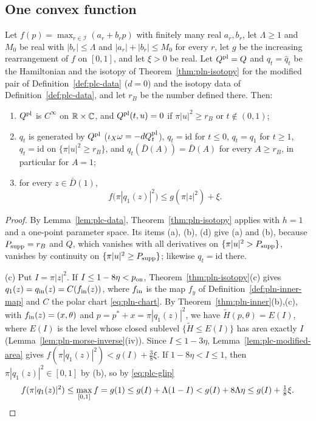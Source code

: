\subsection{One convex function}\label{sec:plc-planar}

\begin{theorem}\label{thm:plc-planar}
Let $f(p)=\max_{r\in\mathcal I}(a_r+b_rp)$ with finitely many real $a_r,b_r$, let $\Lambda\ge1$ and $M_0$ be real with $|b_r|\le\Lambda$
and $|a_r|+|b_r|\le M_0$ for every $r$, let $g$ be the increasing rearrangement of $f$ on $[0,1]$, and let $\xi>0$ be real. Let
$Q^{\rm pl}=Q$ and $q_t=\hat q_t$ be the Hamiltonian and the isotopy of Theorem~\ref{thm:pln-isotopy} for the
modified pair of Definition~\ref{def:plc-data} ($d=0$) and the isotopy data of Definition~\ref{def:plc-data}, and let $r_B$ be
the number defined there. Then:
\begin{enumerate}[label=(\alph*)]
\item $Q^{\rm pl}$ is $C^\infty$ on $\mathbb{R}\times\mathbb{C}$, and $Q^{\rm pl}(t,u)=0$ if $\pi|u|^2\ge r_B$ or $t\notin(0,1)$;
\item $q_t$ is generated by $Q^{\rm pl}$ ($\iota_X\omega=-dQ^{\rm pl}_t$), $q_t=\mathrm{id}$ for $t\le0$, $q_t=q_1$ for $t\ge1$,
 $q_t=\mathrm{id}$ on $\{\pi|u|^2\ge r_B\}$, and $q_t(\bar D(A))=\bar D(A)$ for every $A\ge r_B$, in particular for $A=1$;
\item for every $z\in\bar D(1)$,
 \[
  f\bigl(\pi|q_1(z)|^2\bigr)\le g(\pi|z|^2)+\xi .
 \]
\end{enumerate}
\end{theorem}

\begin{proof}
By Lemma~\ref{lem:plc-data}, Theorem~\ref{thm:pln-isotopy} applies with $h=1$ and a one-point parameter space. Its
items (a), (b), (d) give (a) and (b), because $P_{\rm supp}=r_B$ and $Q$, which vanishes with all derivatives on
$\{\pi|u|^2>P_{\rm supp}\}$, vanishes by continuity on $\{\pi|u|^2\ge P_{\rm supp}\}$; likewise $q_t=\mathrm{id}$ there.

(c) Put $I=\pi|z|^2$. If $I\le1-8\eta<p_{\rm on}$, Theorem~\ref{thm:pln-isotopy}(c) gives $q_1(z)=q_{\rm in}(z)=C(f_{\rm in}(z))$,
where $f_{\rm in}$ is the map $f_y$ of Definition~\ref{def:pln-inner-map} and $C$ the polar chart \eqref{eq:pln-chart}. By
Theorem~\ref{thm:pln-inner}(b),(c), with $f_{\rm in}(z)=(x,\theta)$ and $p=p^*+x=\pi|q_1(z)|^2$, we have
$\widetilde H(p,\theta)=E(I)$, where $E(I)$ is the level whose closed sublevel $\{\widetilde H\le E(I)\}$ has area exactly $I$
(Lemma~\ref{lem:pln-morse-inverse}(iv)). Since $I\le1-3\eta$, Lemma~\ref{lem:plc-modified-area} gives
$f(\pi|q_1(z)|^2)<g(I)+\frac38\xi$. If $1-8\eta<I\le1$, then $\pi|q_1(z)|^2\in[0,1]$ by (b), so by \eqref{eq:plc-glip}
\[
 f(\pi|q_1(z)|^2)\le\max_{[0,1]}f=g(1)\le g(I)+\Lambda(1-I)<g(I)+8\Lambda\eta\le g(I)+\tfrac18\xi .\qedhere
\]
\end{proof}

